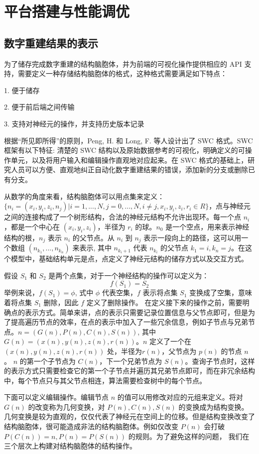 \chapter{平台搭建与性能调优}
\label{chap3}

\section{数字重建结果的表示}
为了储存完成数字重建的结构脑胞体，并为前端的可视化操作提供相应的 API 支持，需要定义一种存储结构脑胞体的格式，这种格式需要满足如下特点：

1. 便于储存

2. 便于前后端之间传输

3. 支持对神经元的操作，并支持历史版本记录

根据“所见即所得”的原则，Peng, H. 和 Long, F. 等人设计出了 SWC 格式。SWC 框架有以下特征: 清楚的 SWC 结构以及原始数据参考的可视化，明确定义的可操作单元，以及将用户输入和编辑操作直观地对应起来。在 SWC 格式的基础上，研究人员可以方便、直观地纠正自动化数字重建结果的错误，添加新的分支或删除已有分支。

从数学的角度来看，结构脑胞体可以用点集来定义：$\{ n_i = (x_i, y_i, z_i, n_j) | i = 1,..., N, j = 0,..., N, i \neq j, x_i, y_i, z_i, r_i \in R \}$，点与神经元之间的连接构成了一个树形结构，合法的神经元结构不允许出现环。每一个点 $n_i$，都是一个中心在 $(x_i, y_i, z_i)$，半径为 $r_i$ 的球。$n_0$ 是一个空点，用来表示神经结构的根，$n_j$ 表示 $n_i$ 的父节点。从 $n_i$ 到 $n_j$ 表示一段向上的路径，这可以用一个数组 $(n_{k_1},...,n_{k_n})$ 来表示, 其中 $n_{k_i+1}$ 代表 $n_{k_i}$ 的父节点 $k_1 = i, k_n = j$。在这个模型中，基础结构单元是点，点定义了神经元结构的储存方式以及交互方式。

假设 $S_1$ 和 $S_2$ 是两个点集，对于一个神经结构的操作可以定义为：
$$f(S_1) = S_2$$
举例来说，$f(S_1)= \phi$, 式中 $\phi$ 代表空集，$f$ 表示将点集 $S_1$ 变换成了空集，意味着将点集 $S_1$ 删除，因此 $f$ 定义了删除操作。
在定义接下来的操作之前，需要明确点的表示方式。简单来讲，点的表示只需要记录位置信息与父节点即可，但是为了提高遍历节点的效率，在点的表示中加入了一些冗余信息，例如子节点与兄弟节点。$n=(G(n), P(n), C(n), S(n))$, 其中 $G(n) = (x(n), y(n), z(n), r(n))$。$n$ 定义了一个在$(x(n), y(n), z(n), r(n))$ 处，半径为$r(n)$，父节点为 $p(n)$ 的节点 $n$。 $n$ 的第一个子节点为 $C(n)$，下一个兄弟节点为 $S(n)$。查询子节点时，这样的表示方式只需要检查它的第一个子节点并遍历其兄弟节点即可，而在非冗余结构中，每个节点只与其父节点相连，算法需要检查树中的每个节点。

下面可以定义编辑操作。编辑节点 $n$ 的值可以用修改对应的元组来定义。将对 $G(n)$ 的改变称为几何变换，对 $P(n), C(n), S(n)$ 的变换成为结构变换。几何变换是较为直观的，仅仅代表了神经元在空间上的位移。但是结构变换改变了结构脑胞体，很可能造成非法的结构脑胞体。例如仅改变 $P(n)$ 会打破 $P(C(n)) = n, P(n) = P(S(n))$ 的规则。为了避免这样的问题， 我们在三个层次上构建对结构脑胞体的结构操作。

